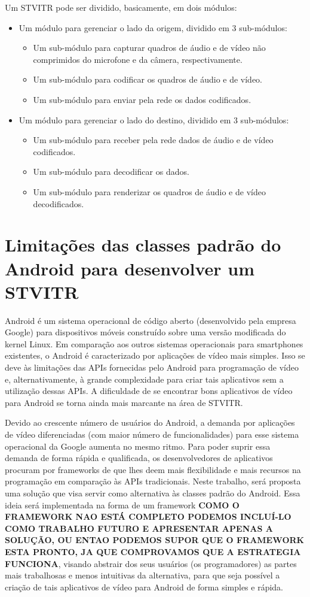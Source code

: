 \documentclass{acm_proc_article-sp}
\newcommand{\todo}[1]{\textcolor[rgb]{1.00,0.00,0.00}{\bf \uppercase{#1}}}
\begin{document}
Um STVITR pode ser dividido, basicamente, em dois módulos:
\begin{itemize}
 \item Um módulo para gerenciar o lado da origem, dividido em 3 sub-módulos:
 \begin{itemize}
  \item Um sub-módulo para capturar quadros de áudio e de vídeo não comprimidos do microfone e da câmera, respectivamente.
  \item Um sub-módulo para codificar os quadros de áudio e de vídeo.
  \item Um sub-módulo para enviar pela rede os dados codificados.
 \end{itemize}
 \item Um módulo para gerenciar o lado do destino, dividido em 3 sub-módulos:
 \begin{itemize}
  \item Um sub-módulo para receber pela rede dados de áudio e de vídeo codificados.
  \item Um sub-módulo para decodificar os dados.
  \item Um sub-módulo para renderizar os quadros de áudio e de vídeo decodificados.
 \end{itemize}
\end{itemize}

\section{Limitações das classes padrão do Android para desenvolver um STVITR}

Android é um sistema operacional de código aberto (desenvolvido pela empresa Google) para dispositivos móveis construído sobre uma versão modificada do kernel Linux. Em comparação aos outros sistemas operacionais para smartphones existentes, o Android é caracterizado por aplicações de vídeo mais simples. Isso se deve às limitações das APIs fornecidas pelo Android para programação de vídeo e, alternativamente, à grande complexidade para criar tais aplicativos sem a utilização dessas APIs. A dificuldade de se encontrar bons aplicativos de vídeo para Android se torna ainda mais marcante na área de STVITR.

Devido ao crescente número de usuários do Android, a demanda por aplicações de vídeo diferenciadas (com maior número de funcionalidades) para esse sistema operacional da Google aumenta no mesmo ritmo. Para poder suprir essa demanda de forma rápida e qualificada, os desenvolvedores de aplicativos procuram por  frameworks de que lhes deem mais flexibilidade e mais recursos na programação em comparação às APIs tradicionais. Neste trabalho, será proposta uma solução que visa servir como alternativa às classes padrão do Android. Essa ideia será implementada na forma de um framework \todo{como o framework nao está completo podemos incluí-lo como trabalho futuro e apresentar apenas a solução, ou entao podemos supor que o framework esta pronto, ja que comprovamos que a estrategia funciona}, visando abstrair dos seus usuários (os programadores) as partes mais trabalhosas e menos intuitivas da alternativa, para que seja possível a criação de tais aplicativos de vídeo para Android de forma simples e rápida.
\end{document}
